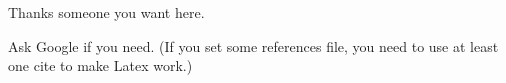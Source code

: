 
Thanks someone you want here.

Ask Google\cite{website:google} if you need. (If you set some references file, you need to use at least one cite to make Latex work.)

\EndAcknowledgments

